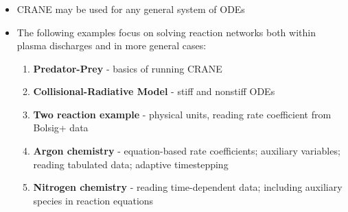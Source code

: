 \begin{frame}[fragile]
	\frametitle{\insertsectionhead}
	\begin{itemize}
		\item CRANE may be used for any general system of ODEs
		\item The following examples focus on solving reaction networks both within plasma discharges and in more general cases:
		\begin{enumerate}
			\item \textbf{Predator-Prey} - basics of running CRANE
			\item \textbf{Collisional-Radiative Model} - stiff and nonstiff ODEs
			\item \textbf{Two reaction example} - physical units, reading rate coefficient from Bolsig+ data
			\item \textbf{Argon chemistry} - equation-based rate coefficients; auxiliary variables; reading tabulated data; adaptive timestepping
			\item \textbf{Nitrogen chemistry} - reading time-dependent data; including auxiliary species in reaction equations
		\end{enumerate}
	\end{itemize}
\end{frame}